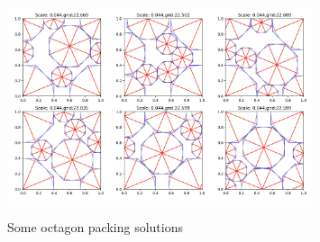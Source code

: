 \documentclass[12pt]{article}
\begin{document}
\begin{figure}
    \centering
    \includegraphics[width=0.8\textwidth]{octagon packings 2.png}\label{fig:octagon packings}\caption{Some octagon packing solutions}
\end{figure}

 
\end{document}
